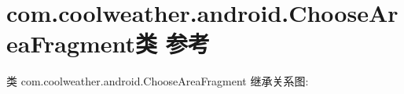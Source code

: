 \hypertarget{classcom_1_1coolweather_1_1android_1_1_choose_area_fragment}{}\section{com.\+coolweather.\+android.\+Choose\+Area\+Fragment类 参考}
\label{classcom_1_1coolweather_1_1android_1_1_choose_area_fragment}


类 com.\+coolweather.\+android.\+Choose\+Area\+Fragment 继承关系图\+:
